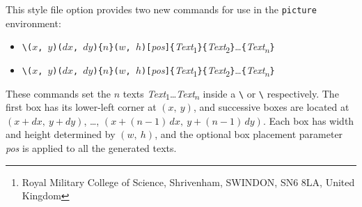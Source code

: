 \documentclass[pagesize=auto, parskip=half, fontsize=12pt, DIV=11]{scrartcl}
\title{\pkg{MULTIBOX.STY}}
\subtitle{A style option to provide multiple boxes in pictures}
\author{Brian HAMILTON KELLY\thanks{Royal Military College of Science, Shrivenham, SWINDON, SN6 8LA, United Kingdom}}
\date{13 October 1988}
\makeatletter
\newcommand*{\cs}[1]{\texttt{\textbackslash#1}}
\newcommand*{\cmd}[1]{\cs{\expandafter\@gobble\string#1}}
\newcommand*{\env}[1]{\texttt{#1}}
\newcommand*{\meta}[1]{\textlangle\textsl{#1}\textrangle}
\newcommand*{\marg}[1]{\texttt{\{}\meta{#1}\texttt{\}}}
\newcommand*{\narg}[1]{\texttt{\{$#1$\}}}
\newcommand*{\oarg}[1]{\texttt{[}\meta{#1}\texttt{]}}
\newcommand*{\pargs}[2]{\texttt{($#1$,\,$#2$)}}
\newcommand*{\coord}[2]{$(#1,\:#2)$}
\newcommand*{\txt}[1]{Text\textsubscript{$#1$}}
\makeatother
\begin{document}
\maketitle

This style file option provides two new commands for use in the \env{picture}
environment:
%
\begin{itemize}
\item \cmd{\multimake}\pargs{x}{y}\pargs{dx}{dy}\narg{n}\pargs{w}{h}\oarg{pos}\marg{\txt{1}}\marg{\txt{2}}\ldots\marg{\txt{n}}
\item \cmd{\multiframe}\pargs{x}{y}\pargs{dx}{dy}\narg{n}\pargs{w}{h}\oarg{pos}\marg{\txt{1}}\marg{\txt{2}}\ldots\marg{\txt{n}}
\end{itemize}
%
These commands set the $n$ texts \meta{\txt{1}}\ldots\meta{\txt{n}} inside a \cmd{\makebox} or
\cmd{\framebox} respectively.  The first box has its lower-left corner at \coord{x}{y},
and successive boxes are located at \coord{x+dx}{y+dy}, \ldots, \coord{x+(n-1)\,dx}{y+(n-1)\,dy}.
Each box has width and height determined by \coord{w}{h}, and the optional
box placement parameter \meta{pos} is applied to all the generated texts.
\end{document}
